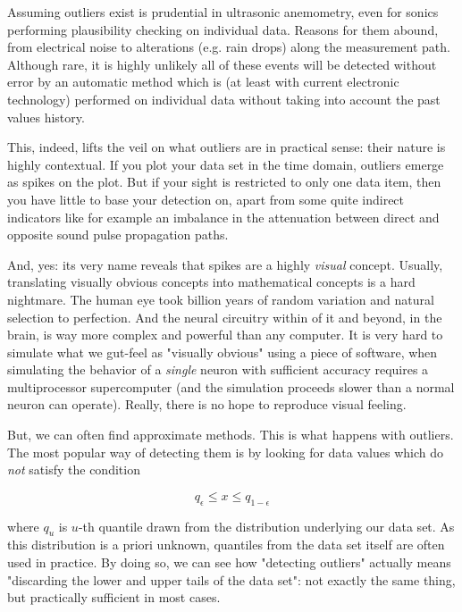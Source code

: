 \documentclass[a4paper,10pt]{book}
\begin{document}
Assuming outliers exist is prudential in ultrasonic anemometry, even for sonics performing plausibility checking on individual data. Reasons for them abound, from electrical noise to alterations (e.g. rain drops) along the measurement path. Although rare, it is highly unlikely all of these events will be detected without error by an automatic method which is (at least with current electronic technology) performed on individual data without taking into account the past values history.

This, indeed, lifts the veil on what outliers are in practical sense: their nature is highly contextual. If you plot your data set in the time domain, outliers emerge as spikes on the plot. But if your sight is restricted to only one data item, then you have little to base your detection on, apart from some quite indirect indicators like for example an imbalance in the attenuation between direct and opposite sound pulse propagation paths.

And, yes: its very name reveals that spikes are a highly \emph{visual} concept. Usually, translating visually obvious concepts into mathematical concepts is a hard nightmare. The human eye took billion years of random variation and natural selection to perfection. And the neural circuitry within of it and beyond, in the brain, is way more complex and powerful than any computer. It is very hard to simulate what we gut-feel as "visually obvious" using a piece of software, when simulating the behavior of a \emph{single} neuron with sufficient accuracy requires a multiprocessor supercomputer (and the simulation proceeds slower than a normal neuron can operate). Really, there is no hope to reproduce visual feeling.

But, we can often find approximate methods. This is what happens with outliers. The most popular way of detecting them is by looking for data values which do \emph{not} satisfy the condition

\begin{equation}\label{eq:Common outlier detection method}
	q_{\epsilon} \le x \le q_{1-\epsilon}
\end{equation}

\noindent where $q_{u}$ is $u$-th quantile drawn from the distribution underlying our data set. As this distribution is a priori unknown, quantiles from the data set itself are often used in practice. By doing so, we can see how "detecting outliers" actually means "discarding the lower and upper tails of the data set": not exactly the same thing, but practically sufficient in most cases.
\end{document}
